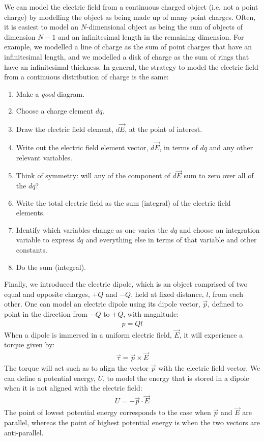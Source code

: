 \begin{chapterSummary}
We can model the electric field from a continuous charged object (i.e. not a point charge) by modelling the object as being made up of many point charges. Often, it is easiest to model an $N$-dimensional object as being the sum of objects of dimension $N-1$ and an infinitesimal length in the remaining dimension. For example, we modelled a line of charge as the sum of point charges that have an infinitesimal length, and we modelled a disk of charge as the sum of rings that have an infinitesimal thickness. In general, the strategy to model the electric field from a continuous distribution of charge is the same:

\begin{enumerate}
\item Make a \textit{good} diagram.
\item Choose a charge element $dq$.
\item Draw the electric field element, $d\vec E$, at the point of interest.
\item Write out the electric field element vector, $d\vec E$, in terms of $dq$ and any other relevant variables.
\item Think of symmetry: will any of the component of $d\vec E$ sum to zero over all of the $dq$?
\item Write the total electric field as the sum (integral) of the electric field elements.
\item Identify which variables change as one varies the $dq$ and choose an integration variable to express $dq$ and everything else in terms of that variable and other constants.
\item Do the sum (integral).
\end{enumerate}

Finally, we introduced the electric dipole, which is an object comprised of two equal and opposite charges, $+Q$ and $-Q$, held at fixed distance, $l$, from each other. One can model an electric dipole using its dipole vector, $\vec p$, defined to point in the direction from $-Q$ to $+Q$, with magnitude:
\begin{align*}
p=Ql
\end{align*} 
When a dipole is immersed in a uniform electric field, $\vec E$, it will experience a torque given by:
\begin{align*}
\vec\tau=\vec p\times \vec E
\end{align*}
The torque will act such as to align the vector $\vec p$ with the electric field vector. We can define a potential energy, $U$, to model the energy that is stored in a dipole when it is not aligned with the electric field:
\begin{align*}
U=-\vec p \cdot \vec E
\end{align*}
The point of lowest potential energy corresponds to the case when $\vec p$ and $\vec E$ are parallel, whereas the point of highest potential energy is when the two vectors are anti-parallel.
\end{chapterSummary}

